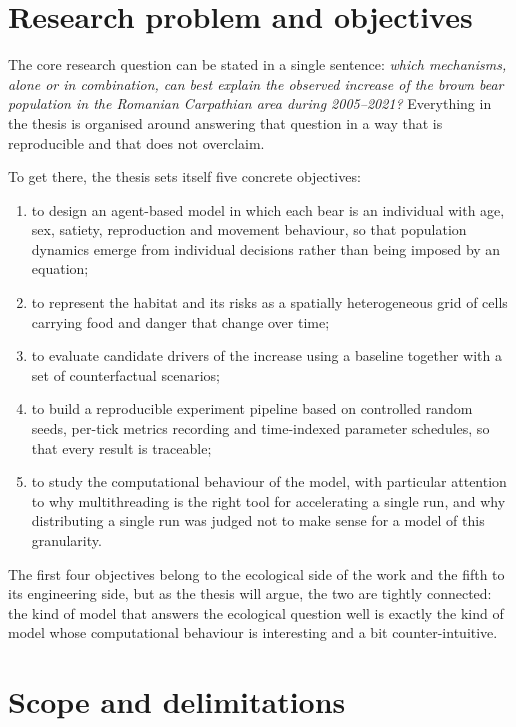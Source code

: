 \section{Research problem and objectives}

The core research question can be stated in a single sentence: \emph{which mechanisms, alone or in combination, can best explain the observed increase of the brown bear population in the Romanian Carpathian area during 2005--2021?} Everything in the thesis is organised around answering that question in a way that is reproducible and that does not overclaim.

To get there, the thesis sets itself five concrete objectives:

\begin{enumerate}
    \item to design an agent-based model in which each bear is an individual with age, sex, satiety, reproduction and movement behaviour, so that population dynamics emerge from individual decisions rather than being imposed by an equation;
    \item to represent the habitat and its risks as a spatially heterogeneous grid of cells carrying food and danger that change over time;
    \item to evaluate candidate drivers of the increase using a baseline together with a set of counterfactual scenarios;
    \item to build a reproducible experiment pipeline based on controlled random seeds, per-tick metrics recording and time-indexed parameter schedules, so that every result is traceable;
    \item to study the computational behaviour of the model, with particular attention to why multithreading is the right tool for accelerating a single run, and why distributing a single run was judged not to make sense for a model of this granularity.
\end{enumerate}

The first four objectives belong to the ecological side of the work and the fifth to its engineering side, but as the thesis will argue, the two are tightly connected: the kind of model that answers the ecological question well is exactly the kind of model whose computational behaviour is interesting and a bit counter-intuitive.

\section{Scope and delimitations}

